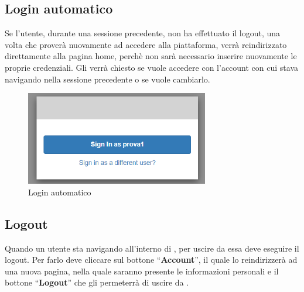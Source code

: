 {    \subsection{Login automatico} {
        Se l'utente, durante una sessione precedente, non ha effettuato il logout, una volta che proverà nuovamente ad accedere alla piattaforma,  
         verrà reindirizzato direttamente alla pagina home, perchè non sarà necessario inserire nuovamente le proprie credenziali. 
         Gli verrà chiesto se vuole accedere con l'account con cui stava navigando nella sessione precedente o se vuole cambiarlo.
         \begin{figure}[H]
            \includegraphics[width=8cm]{sezioni/images/login-auto.png}
            \centering
            \caption{Login automatico}
        \end{figure}
    }
    
    \subsection{Logout} {
        Quando un utente sta navigando all'interno di \platform, per uscire da essa deve eseguire il logout. Per farlo deve cliccare sul bottone ``\textbf{Account}'', il quale lo reindirizzerà ad una nuova pagina,
        nella quale saranno presente le informazioni personali e il bottone ``\textbf{Logout}'' che gli permeterrà di uscire da \platform. 
          
    }




}
